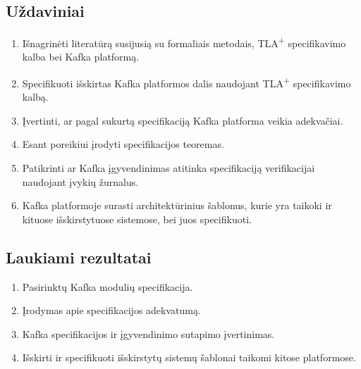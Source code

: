 \documentclass{VUMIFPSmagistrinis}
\begin{document}
	
	\subsection{Uždaviniai}
		\begin{enumerate}
			\item{Išnagrinėti literatūrą susijusią su formaliais metodais, TLA\textsuperscript{+} specifikavimo kalba bei Kafka platformą.}
			\item{Specifikuoti išskirtas Kafka platformos dalis naudojant TLA\textsuperscript{+} specifikavimo kalbą.}
			\item{Įvertinti, ar pagal sukurtą specifikaciją Kafka platforma veikia adekvačiai.}
			\item{Esant poreikiui įrodyti specifikacijos teoremas.}
			\item{Patikrinti ar Kafka įgyvendinimas atitinka specifikaciją verifikacijai naudojant įvykių žurnalus.}
			\item{Kafka platformoje surasti architektūrinius šablonus, kurie yra taikoki ir kituose išskirstytuose sistemose, bei juos specifikuoti.}
		\end{enumerate}
	
	\subsection{Laukiami rezultatai}
		\begin{enumerate}
			\item{Pasirinktų Kafka modulių specifikacija.}
			\item{Įrodymas apie specifikacijos adekvatumą.}
			\item{Kafka
 specifikacijos ir įgyvendinimo sutapimo įvertinimas.}
			\item{Išskirti ir specifikuoti išskirstytų sistemų šablonai taikomi kitose platformose.}
		\end{enumerate}
	
	\printbibliography[heading=bibintoc] 
\end{document}
